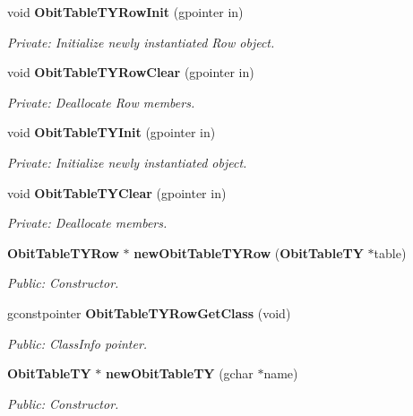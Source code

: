 \begin{CompactItemize}
\item 
void {\bf Obit\-Table\-TYRow\-Init} (gpointer in)
\begin{CompactList}\small\item\em Private: Initialize newly instantiated Row object. \item\end{CompactList}\item 
void {\bf Obit\-Table\-TYRow\-Clear} (gpointer in)
\begin{CompactList}\small\item\em Private: Deallocate Row members. \item\end{CompactList}\item 
void {\bf Obit\-Table\-TYInit} (gpointer in)
\begin{CompactList}\small\item\em Private: Initialize newly instantiated object. \item\end{CompactList}\item 
void {\bf Obit\-Table\-TYClear} (gpointer in)
\begin{CompactList}\small\item\em Private: Deallocate members. \item\end{CompactList}\item 
{\bf Obit\-Table\-TYRow} $\ast$ {\bf new\-Obit\-Table\-TYRow} ({\bf Obit\-Table\-TY} $\ast$table)
\begin{CompactList}\small\item\em Public: Constructor. \item\end{CompactList}\item 
gconstpointer {\bf Obit\-Table\-TYRow\-Get\-Class} (void)
\begin{CompactList}\small\item\em Public: Class\-Info pointer. \item\end{CompactList}\item 
{\bf Obit\-Table\-TY} $\ast$ {\bf new\-Obit\-Table\-TY} (gchar $\ast$name)
\begin{CompactList}\small\item\em Public: Constructor. \item\end{CompactList}\item 

\end{CompactItemize}
